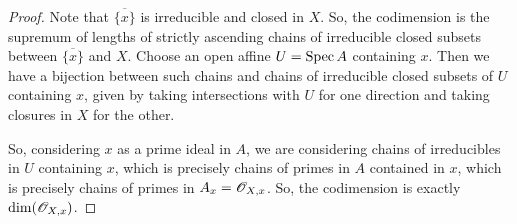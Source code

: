\begin{proof}
	Note that $\overline{\{x\}}$ is irreducible and closed in $X$. So, the codimension is the supremum of lengths of strictly ascending chains of irreducible closed subsets between $\overline{\{x\}}$ and $X$. Choose an open affine $U = \operatorname{Spec} A$ containing $x$. Then we have a bijection between such chains and chains of irreducible closed subsets of $U$ containing $x$, given by taking intersections with $U$ for one direction and taking closures in $X$ for the other.
	
	So, considering $x$ as a prime ideal in $A$, we are considering chains of irreducibles in $U$ containing $x$, which is precisely chains of primes in $A$ contained in $x$, which is precisely chains of primes in $A_x = \mathscr{O}_{X,x}$. So, the codimension is exactly $\dim(\mathscr{O}_{X,x})$.
\end{proof}
